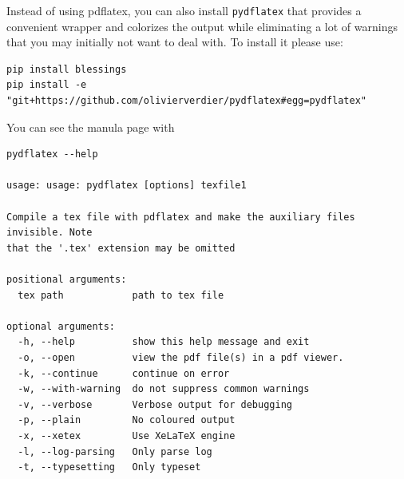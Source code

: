 Instead of using pdflatex, you can also install \verb|pydflatex| that
provides a convenient wrapper and colorizes the output while
eliminating a lot of warnings that you may initially not want to deal
with. To install it please use:

\begin{verbatim}
pip install blessings
pip install -e "git+https://github.com/olivierverdier/pydflatex#egg=pydflatex"
\end{verbatim}

You can see the manula page with 

\begin{verbatim}
pydflatex --help

usage: usage: pydflatex [options] texfile1

Compile a tex file with pdflatex and make the auxiliary files invisible. Note
that the '.tex' extension may be omitted

positional arguments:
  tex path            path to tex file

optional arguments:
  -h, --help          show this help message and exit
  -o, --open          view the pdf file(s) in a pdf viewer.
  -k, --continue      continue on error
  -w, --with-warning  do not suppress common warnings
  -v, --verbose       Verbose output for debugging
  -p, --plain         No coloured output
  -x, --xetex         Use XeLaTeX engine
  -l, --log-parsing   Only parse log
  -t, --typesetting   Only typeset
\end{verbatim}

